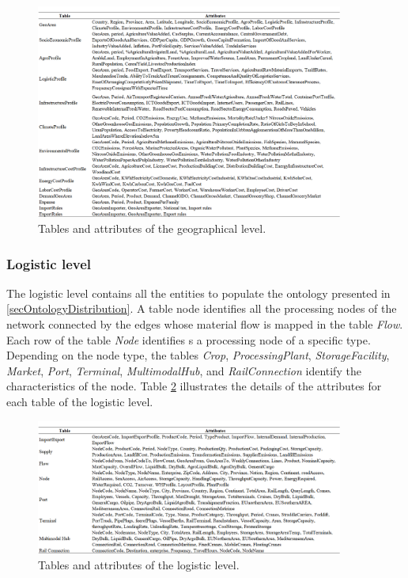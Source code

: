 \begin{figure}[hbt!]
\centering
\includegraphics[width=0.9\textwidth]{SectionDistribution/diagnosticModels_figures/tab_geo_attributes.png}
\captionsetup{type=table}
\caption{Tables and attributes of the geographical level.}
\label{tab_geo_attributes}
\end{figure}


\subsubsection{Logistic level}

The logistic level contains all the entities to populate the ontology presented in \ref{secOntologyDistribution}. A table node identifies all the processing nodes of the network connected by the edges whose material flow is mapped in the table \textit{Flow}. Each row of the table \textit{Node} identifies s a processing node of a specific type. Depending on the node type, the tables \textit{Crop}, \textit{ProcessingPlant}, \textit{StorageFacility}, \textit{Market}, \textit{Port}, \textit{Terminal}, \textit{MultimodalHub}, and \textit{RailConnection} identify the characteristics of the node. Table \ref{tab_log_attributes} illustrates the details of the attributes for each table of the logistic level.


\begin{figure}[hbt!]
\centering
\includegraphics[width=0.9\textwidth]{SectionDistribution/diagnosticModels_figures/tab_log_attributes.png}
\captionsetup{type=table}
\caption{Tables and attributes of the logistic level.}
\label{tab_log_attributes}
\end{figure}


